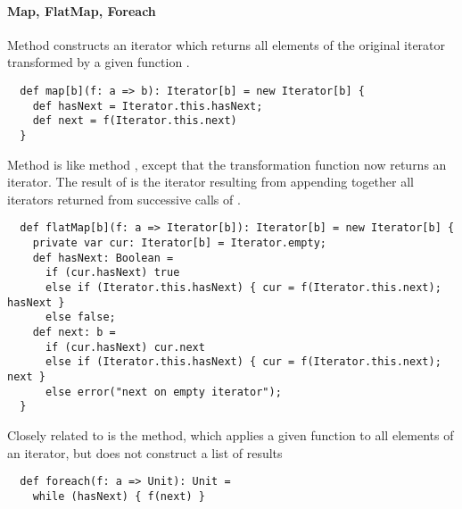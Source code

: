 \documentclass[a4paper,12pt,twoside,titlepage]{book}
\begin{document}
{\paragraph{Map, FlatMap, Foreach} Method  
constructs an iterator which returns all elements of the original
iterator transformed by a given function .
\begin{lstlisting}
  def map[b](f: a => b): Iterator[b] = new Iterator[b] {
    def hasNext = Iterator.this.hasNext;
    def next = f(Iterator.this.next)
  }
\end{lstlisting}
Method  is like method , except that the
transformation function  now returns an iterator.
The result of  is the iterator resulting from appending
together all iterators returned from successive calls of .
\begin{lstlisting}
  def flatMap[b](f: a => Iterator[b]): Iterator[b] = new Iterator[b] {
    private var cur: Iterator[b] = Iterator.empty;
    def hasNext: Boolean = 
      if (cur.hasNext) true
      else if (Iterator.this.hasNext) { cur = f(Iterator.this.next); hasNext }
      else false;
    def next: b = 
      if (cur.hasNext) cur.next
      else if (Iterator.this.hasNext) { cur = f(Iterator.this.next); next }
      else error("next on empty iterator");
  }
\end{lstlisting}
Closely related to  is the  method, which
applies a given function to all elements of an iterator, but does not
construct a list of results
\begin{lstlisting}
  def foreach(f: a => Unit): Unit = 
    while (hasNext) { f(next) }
\end{lstlisting}

}
\end{document}
